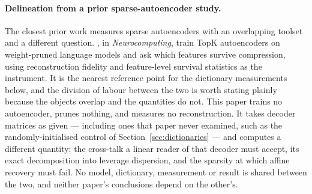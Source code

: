 \paragraph{Delineation from a prior sparse-autoencoder study.} The closest prior work measures
sparse autoencoders with an overlapping toolset and a different question.
\citet{borobia2026pruning}, in \emph{Neurocomputing}, train TopK autoencoders on weight-pruned
language models and ask which features survive compression, using reconstruction fidelity and
feature-level survival statistics as the instrument. It is the nearest reference point for the
dictionary measurements below, and the division of labour between the two is worth stating plainly
because the objects overlap and the quantities do not. This paper trains no autoencoder, prunes
nothing, and measures no reconstruction. It
takes decoder matrices as given --- including ones that paper never examined, such as the
randomly-initialised control of Section~\ref{sec:dictionaries} --- and computes a different quantity:
the cross-talk a linear reader of that decoder must accept, its exact decomposition into leverage
dispersion, and the sparsity at which affine recovery must fail. No model, dictionary, measurement or
result is shared between the two, and neither paper's conclusions depend on the other's.

